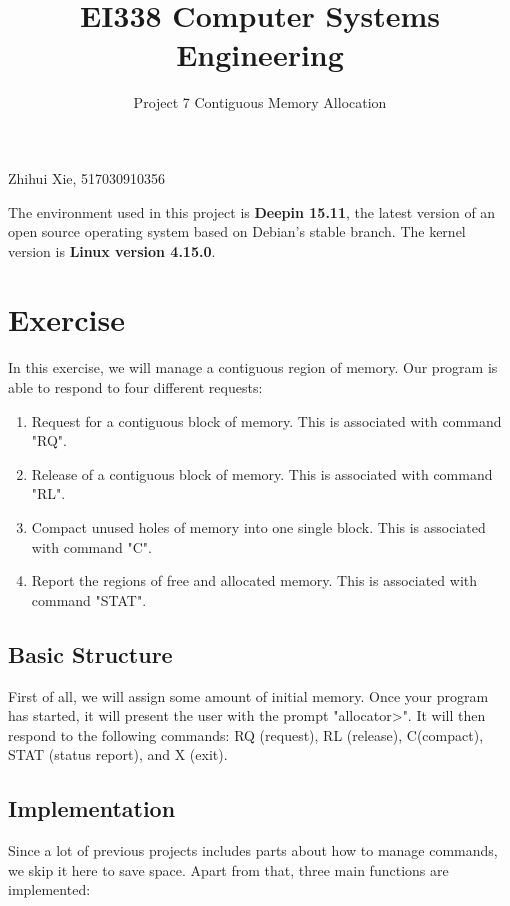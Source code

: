 \documentclass{article}
\title{EI338 Computer Systems Engineering}
\author{Project 7 Contiguous Memory Allocation}
\begin{document}
\maketitle

\begin{center}
    Zhihui Xie, 517030910356
\end{center}

The environment used in this project is \textbf{Deepin 15.11}, the latest version of an open source operating system based on Debian's stable branch. The kernel version is \textbf{Linux version 4.15.0}.

\section*{Exercise}
In this exercise, we will manage a contiguous region of memory. Our program is able to respond to four different requests: 

\begin{enumerate}
    \item Request for a contiguous block of memory. This is associated with command "RQ".
    \item Release of a contiguous block of memory. This is associated with command "RL".
    \item Compact unused holes of memory into one single block. This is associated with command "C".
    \item Report the regions of free and allocated memory. This is associated with command "STAT".
\end{enumerate}

\subsection*{Basic Structure}
First of all, we will assign some amount of initial memory. Once your program has started, it will present the user with the prompt "allocator>". It will then respond to the following commands: RQ (request), RL (release), C(compact), STAT (status report), and X (exit).

\subsection*{Implementation}
Since a lot of previous projects includes parts about how to manage commands, we skip it here to save space. Apart from that, three main functions are implemented:
\end{document}
